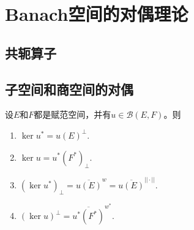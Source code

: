\section{Banach空间的对偶理论}
\subsection{共轭算子}



\subsection{子空间和商空间的对偶}

\begin{theorem}
    设$E$和$F$都是赋范空间，并有$u\in \mathcal{B}(E,F)$。则
    \begin{enumerate}
        \item $\ker u^{*}=u(E)^{\perp}$.
        \item $\ker u=u^{*}(F^{*})_{\perp}$.
        \item $(\ker u^{*})_{\perp}=\overline{u(E)}^{w}=\overline{u(E)}^{||\cdot||}$.
        \item $(\ker u)^{\perp}=\overline{u^{*}(F^{*})}^{w^{*}}$.
    \end{enumerate}
\end{theorem}